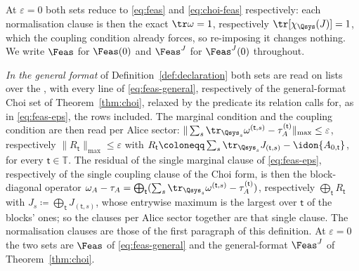 \begin{definition}
At $\varepsilon=0$ both sets reduce to \eqref{eq:feas} and
\eqref{eq:choi-feas} respectively: each normalisation clause is then the
exact $\tr\omega=1$, respectively $\tr[\chi_{\Qsys}(J)]=1$, which the
coupling condition already forces, so re-imposing it changes nothing. We
write $\Feas$ for $\Feas(0)$ and $\Feas^{J}$ for $\Feas^{J}(0)$
throughout.

\emph{In the general format} of Definition~\ref{def:declaration} both sets
are read on lists over the , with every
line of \eqref{eq:feas-general}, respectively of the general-format Choi
set of Theorem~\ref{thm:choi}, relaxed by the predicate its relation calls
for, as in \eqref{eq:feas-eps}, the  rows included. The
marginal condition and the coupling condition are then read per Alice
sector:
$\|\sum_s\tr_{\Qsys_s}\omega^{(\mathsf t,s)}-\tau^{(\mathsf t)}_A\|_{\max}
\le\varepsilon$, respectively
$\|R_{\mathsf t}\|_{\max}\le\varepsilon$ with
$R_{\mathsf t}\coloneqq\sum_s\tr_{\Qsys_s}J_{(\mathsf t,s)}
-\idon{A_{0,\mathsf t}}$, for every $\mathsf t\in\mathbb{T}$. The residual
of the single marginal clause of \eqref{eq:feas-eps}, respectively of the
single coupling clause of the Choi form, is then the block-diagonal operator
$\omega_A-\tau_A=\bigoplus_{\mathsf t}(\sum_s\tr_{\Qsys_s}
\omega^{(\mathsf t,s)}-\tau^{(\mathsf t)}_A)$, respectively
$\bigoplus_{\mathsf t}R_{\mathsf t}$ with
$J_s\coloneqq\bigoplus_{\mathsf t}J_{(\mathsf t,s)}$, whose entrywise
maximum is the largest over $\mathsf t$ of the blocks' ones; so the clauses
per Alice sector together are that single clause. The normalisation clauses
are those of the first paragraph of this definition. At $\varepsilon=0$ the
two sets are $\Feas$ of \eqref{eq:feas-general} and the general-format
$\Feas^{J}$ of Theorem~\ref{thm:choi}.
\end{definition}
